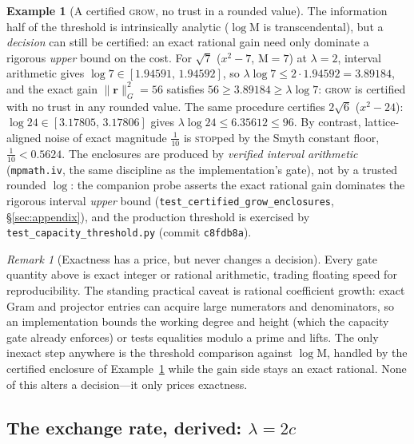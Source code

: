 \documentclass[11pt]{article}
\theoremstyle{plain}
\theoremstyle{definition}
\newtheorem{example}[theorem]{Example}
\theoremstyle{remark}
\newtheorem{remark}[theorem]{Remark}
\newcommand{\Mah}{\mathrm{M}}
\newcommand{\rr}{\mathbf{r}}
\newcommand{\GG}{G}
\begin{document}
\begin{example}[A certified \textsc{grow}, no trust in a rounded value]\label{ex:certified}
The information half of the threshold is intrinsically analytic ($\log\Mah$ is transcendental), but a
\emph{decision} can still be certified: an exact rational gain need only dominate a rigorous \emph{upper} bound
on the cost. For $\sqrt7$ ($x^2-7$, $\Mah=7$) at $\lambda=2$, interval arithmetic gives
$\log 7\in[1.94591,\,1.94592]$, so $\lambda\log 7\le 2\cdot1.94592=3.89184$, and the exact gain
$\lVert\rr\rVert_\GG^2=56$ satisfies $56\ge 3.89184\ge\lambda\log7$: \textsc{grow} is certified with no trust in
any rounded value. The same procedure certifies $2\sqrt6$ ($x^2-24$): $\log 24\in[3.17805,\,3.17806]$ gives
$\lambda\log24\le6.35612\le96$. By contrast, lattice-aligned noise of exact magnitude $\tfrac1{10}$ is
\textsc{stop}ped by the Smyth constant floor, $\tfrac1{10}<0.5624$. The enclosures are produced by
\emph{verified interval arithmetic} (\texttt{mpmath.iv}, the same discipline as the implementation's gate),
not by a trusted rounded $\log$: the companion probe asserts the exact rational gain dominates the rigorous
interval \emph{upper} bound (\texttt{test\_certified\_grow\_enclosures}, \S\ref{sec:appendix}), and the
production threshold is exercised by \texttt{test\_capacity\_threshold.py} (commit \texttt{c8fdb8a}).
\end{example}

\begin{remark}[Exactness has a price, but never changes a decision]\label{rem:cost}
Every gate quantity above is exact integer or rational arithmetic, trading floating speed for
reproducibility. The standing practical caveat is rational coefficient growth: exact Gram and projector entries
can acquire large numerators and denominators, so an implementation bounds the working degree and height
(which the capacity gate already enforces) or tests equalities modulo a prime and lifts. The only inexact step
anywhere is the threshold comparison against $\log\Mah$, handled by the certified enclosure of
Example~\ref{ex:certified} while the gain side stays an exact rational. None of this alters a decision---it
only prices exactness.
\end{remark}

\subsection{The exchange rate, derived: \texorpdfstring{$\lambda=2c$}{lambda = 2c}}\label{subsec:lambda}
\end{document}
